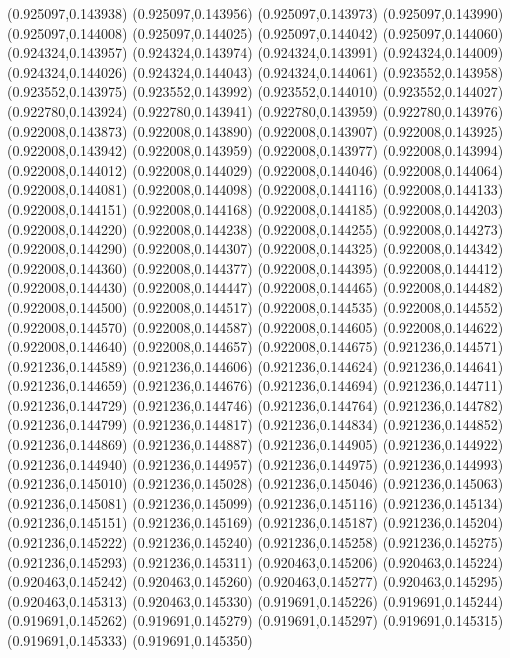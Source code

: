(0.925097,0.143938)
(0.925097,0.143956)
(0.925097,0.143973)
(0.925097,0.143990)
(0.925097,0.144008)
(0.925097,0.144025)
(0.925097,0.144042)
(0.925097,0.144060)
(0.924324,0.143957)
(0.924324,0.143974)
(0.924324,0.143991)
(0.924324,0.144009)
(0.924324,0.144026)
(0.924324,0.144043)
(0.924324,0.144061)
(0.923552,0.143958)
(0.923552,0.143975)
(0.923552,0.143992)
(0.923552,0.144010)
(0.923552,0.144027)
(0.922780,0.143924)
(0.922780,0.143941)
(0.922780,0.143959)
(0.922780,0.143976)
(0.922008,0.143873)
(0.922008,0.143890)
(0.922008,0.143907)
(0.922008,0.143925)
(0.922008,0.143942)
(0.922008,0.143959)
(0.922008,0.143977)
(0.922008,0.143994)
(0.922008,0.144012)
(0.922008,0.144029)
(0.922008,0.144046)
(0.922008,0.144064)
(0.922008,0.144081)
(0.922008,0.144098)
(0.922008,0.144116)
(0.922008,0.144133)
(0.922008,0.144151)
(0.922008,0.144168)
(0.922008,0.144185)
(0.922008,0.144203)
(0.922008,0.144220)
(0.922008,0.144238)
(0.922008,0.144255)
(0.922008,0.144273)
(0.922008,0.144290)
(0.922008,0.144307)
(0.922008,0.144325)
(0.922008,0.144342)
(0.922008,0.144360)
(0.922008,0.144377)
(0.922008,0.144395)
(0.922008,0.144412)
(0.922008,0.144430)
(0.922008,0.144447)
(0.922008,0.144465)
(0.922008,0.144482)
(0.922008,0.144500)
(0.922008,0.144517)
(0.922008,0.144535)
(0.922008,0.144552)
(0.922008,0.144570)
(0.922008,0.144587)
(0.922008,0.144605)
(0.922008,0.144622)
(0.922008,0.144640)
(0.922008,0.144657)
(0.922008,0.144675)
(0.921236,0.144571)
(0.921236,0.144589)
(0.921236,0.144606)
(0.921236,0.144624)
(0.921236,0.144641)
(0.921236,0.144659)
(0.921236,0.144676)
(0.921236,0.144694)
(0.921236,0.144711)
(0.921236,0.144729)
(0.921236,0.144746)
(0.921236,0.144764)
(0.921236,0.144782)
(0.921236,0.144799)
(0.921236,0.144817)
(0.921236,0.144834)
(0.921236,0.144852)
(0.921236,0.144869)
(0.921236,0.144887)
(0.921236,0.144905)
(0.921236,0.144922)
(0.921236,0.144940)
(0.921236,0.144957)
(0.921236,0.144975)
(0.921236,0.144993)
(0.921236,0.145010)
(0.921236,0.145028)
(0.921236,0.145046)
(0.921236,0.145063)
(0.921236,0.145081)
(0.921236,0.145099)
(0.921236,0.145116)
(0.921236,0.145134)
(0.921236,0.145151)
(0.921236,0.145169)
(0.921236,0.145187)
(0.921236,0.145204)
(0.921236,0.145222)
(0.921236,0.145240)
(0.921236,0.145258)
(0.921236,0.145275)
(0.921236,0.145293)
(0.921236,0.145311)
(0.920463,0.145206)
(0.920463,0.145224)
(0.920463,0.145242)
(0.920463,0.145260)
(0.920463,0.145277)
(0.920463,0.145295)
(0.920463,0.145313)
(0.920463,0.145330)
(0.919691,0.145226)
(0.919691,0.145244)
(0.919691,0.145262)
(0.919691,0.145279)
(0.919691,0.145297)
(0.919691,0.145315)
(0.919691,0.145333)
(0.919691,0.145350)
